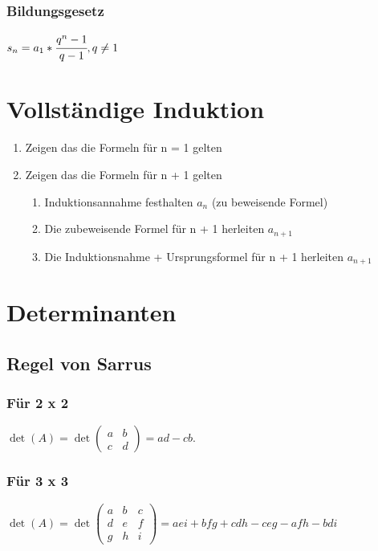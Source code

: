 \documentclass[a4paper,12pt]{scrartcl}
\begin{document}
\subsubsection{Bildungsgesetz}
$s_n = a_1 * \cfrac{q^n - 1}{q - 1}, q \ne 1$

\section{Vollständige Induktion}
\begin{enumerate}
\item Zeigen das die Formeln für n = 1 gelten
\item Zeigen das die Formeln für n + 1 gelten
\begin{enumerate}
\item Induktionsannahme festhalten $a_n$ (zu beweisende Formel)
\item Die zubeweisende Formel für n + 1 herleiten $a_{n+1}$
\item Die Induktionsnahme + Ursprungsformel für n + 1 herleiten $a_{n+1}$
\end{enumerate}
\end{enumerate}

\section{Determinanten}
\subsection{Regel von Sarrus}
\subsubsection{Für 2 x 2}

$
\det(A) = 
\det \begin{pmatrix}
a & b \\ 
c & d 
\end{pmatrix} = ad - cb.
$

\subsubsection{Für 3 x 3}
$ \det(A) = \det
\begin{pmatrix}
  a & b & c \\
  d & e & f \\
  g & h & i
\end{pmatrix} = aei + bfg + cdh - ceg -afh -bdi
$
\end{document}

